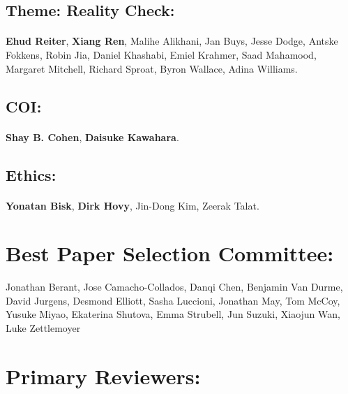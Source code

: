 \subsection*{Theme: Reality Check:}
\paragraph{}\textbf{Ehud Reiter}, \textbf{Xiang Ren}, Malihe Alikhani, Jan Buys, Jesse Dodge, Antske Fokkens, Robin Jia, Daniel Khashabi, Emiel Krahmer, Saad Mahamood, Margaret Mitchell, Richard Sproat, Byron Wallace, Adina Williams.
\subsection*{COI:}
\paragraph{}\textbf{Shay B. Cohen}, \textbf{Daisuke Kawahara}.
\subsection*{Ethics:}
\paragraph{}\textbf{Yonatan Bisk}, \textbf{Dirk Hovy}, Jin-Dong Kim, Zeerak Talat.




\section*{Best Paper Selection Committee:}

Jonathan Berant, Jose Camacho-Collados, Danqi Chen, Benjamin Van Durme, David Jurgens, Desmond Elliott, Sasha Luccioni, Jonathan May, Tom McCoy, Yusuke Miyao, Ekaterina Shutova, Emma Strubell, 
Jun Suzuki, Xiaojun Wan, Luke Zettlemoyer

\section*{Primary Reviewers:}

